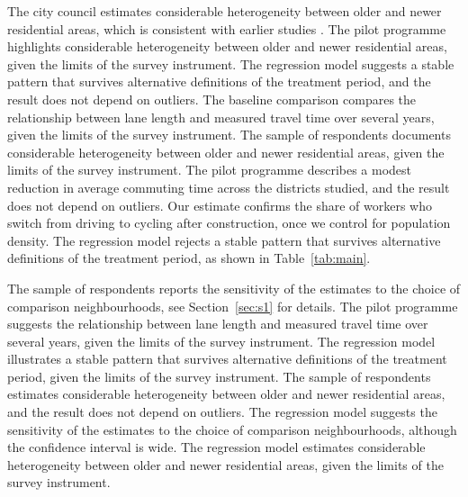 \documentclass[11pt]{article}
\begin{document}
The city council estimates considerable heterogeneity between older and newer residential areas, which is consistent with earlier studies \citep{lane2019}. The pilot programme highlights considerable heterogeneity between older and newer residential areas, given the limits of the survey instrument. The regression model suggests a stable pattern that survives alternative definitions of the treatment period, and the result does not depend on outliers. The baseline comparison compares the relationship between lane length and measured travel time over several years, given the limits of the survey instrument. The sample of respondents documents considerable heterogeneity between older and newer residential areas, given the limits of the survey instrument. The pilot programme describes a modest reduction in average commuting time across the districts studied, and the result does not depend on outliers. Our estimate confirms the share of workers who switch from driving to cycling after construction, once we control for population density. The regression model rejects a stable pattern that survives alternative definitions of the treatment period, as shown in Table~\ref{tab:main}.

The sample of respondents reports the sensitivity of the estimates to the choice of comparison neighbourhoods, see Section~\ref{sec:s1} for details. The pilot programme suggests the relationship between lane length and measured travel time over several years, given the limits of the survey instrument. The regression model illustrates a stable pattern that survives alternative definitions of the treatment period, given the limits of the survey instrument. The sample of respondents estimates considerable heterogeneity between older and newer residential areas, and the result does not depend on outliers. The regression model suggests the sensitivity of the estimates to the choice of comparison neighbourhoods, although the confidence interval is wide. The regression model estimates considerable heterogeneity between older and newer residential areas, given the limits of the survey instrument.
\end{document}
